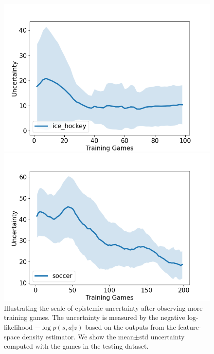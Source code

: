 \documentclass{article}
\newcommand{\state}{s}
\newcommand{\action}{a}
\begin{document}
\begin{figure}[htbp]
\begin{minipage}[t]{0.50\textwidth}
    \hspace{-0.25in}\includegraphics[scale=0.45]{figures/uncertainty_by_games_ice-hockey_maf_type-maf-split_blocks-5_inputs-45_hidden-180_cond-3_lr-0.0001_condValue_Aug-07-2022-23:50_shadow.png}
    \captionsetup{width=.95\linewidth}
\end{minipage}%
\begin{minipage}[t]{0.50\textwidth}
    \centering
    \includegraphics[scale=0.45]{figures/uncertainty_by_games_soccer_maf_type-maf-split_blocks-5_inputs-18_hidden-64_cond-46_lr-0.0001_condAct_condValue_Aug-08-2022-18:09_shadow.png}
    \captionsetup{width=.95\linewidth}
\end{minipage}
\caption{Illustrating the scale of epistemic uncertainty after observing more training games. The uncertainty is measured by the negative log-likelihood $-\log p(\state,\action|z)$ based on the outputs from the feature-space density estimator. We show the mean$\pm$std uncertainty computed with the games in the testing dataset.}
\label{fig:uncertainty-by-games}
\end{figure}
\end{document}
